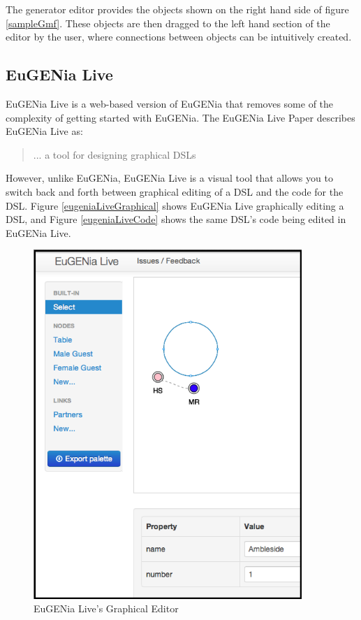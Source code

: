 The generator editor provides the objects shown on the right hand side of figure \ref{sampleGmf}. These objects are then dragged to the left hand section of the editor by the user, where connections between objects can be intuitively created. 

\subsection{EuGENia Live}

EuGENia Live is a web-based version of EuGENia that removes some of the complexity of getting started with EuGENia. The EuGENia Live Paper \citep{eugeniaLivePaper} describes EuGENia Live as: \begin{quote}... a tool for designing graphical DSLs  \end{quote}

However, unlike EuGENia, EuGENia  Live is a visual tool that allows you to switch back and forth between graphical editing of a DSL and the code for the DSL. Figure \ref{eugeniaLiveGraphical} shows EuGENia Live graphically editing a DSL, and Figure \ref{eugeniaLiveCode} shows the same DSL's code being edited in EuGENia Live.

\begin{figure}[h]
\begin{center}
	\includegraphics[width=4in]{figures/eugenia_live_graphical.png}
\end{center}
\caption{EuGENia Live's Graphical Editor \citep{eugeniaLiveDocumentation}}
\label{eugeniaLiveGraphcal}
\end{figure}

